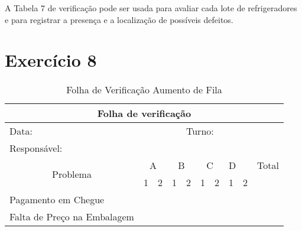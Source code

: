 \documentclass{article}
\begin{document}
A Tabela 7 de verificação pode ser usada para avaliar cada lote de refrigeradores e para registrar a presença e a localização de possíveis defeitos.

\section*{Exercício 8} 

\begin{table}[h!]
\centering
\caption{Folha de Verificação Aumento de Fila}
\begin{tabular}{|llllllllll|}
\hline
\multicolumn{10}{|c|}{Folha de verificação}                                                                                                                                                                                                                       \\ \hline
\multicolumn{4}{|l|}{Data:}                                                                                                  & \multicolumn{6}{l|}{Turno:}                                                                                                        \\ \hline
\multicolumn{10}{|l|}{Responsável:}                                                                                                                                                                                                                               \\ \hline
\multicolumn{1}{|c|}{\multirow{2}{*}{Problema}}   & \multicolumn{2}{c|}{A}                          & \multicolumn{2}{c|}{B}                          & \multicolumn{2}{c|}{C}                          & \multicolumn{2}{l|}{D}                          & Total \\ \cline{2-10} 
\multicolumn{1}{|c|}{}                            & \multicolumn{1}{l|}{1} & \multicolumn{1}{l|}{2} & \multicolumn{1}{c|}{1} & \multicolumn{1}{c|}{2} & \multicolumn{1}{l|}{1} & \multicolumn{1}{l|}{2} & \multicolumn{1}{l|}{1} & \multicolumn{1}{l|}{2} &       \\ \hline
\multicolumn{1}{|l|}{Pagamento em Chegue}         & \multicolumn{1}{l|}{}  & \multicolumn{1}{l|}{}  & \multicolumn{1}{l|}{}  & \multicolumn{1}{l|}{}  & \multicolumn{1}{l|}{}  & \multicolumn{1}{l|}{}  & \multicolumn{1}{l|}{}  & \multicolumn{1}{l|}{}  &       \\ \hline
\multicolumn{1}{|l|}{Falta de Preço na Embalagem} & \multicolumn{1}{l|}{}  & \multicolumn{1}{l|}{}  & \multicolumn{1}{l|}{}  & \multicolumn{1}{l|}{}  & \multicolumn{1}{l|}{}  & \multicolumn{1}{l|}{}  & \multicolumn{1}{l|}{}  & \multicolumn{1}{l|}{}  &       \\ \hline

\end{tabular}
\end{table}
\end{document}

